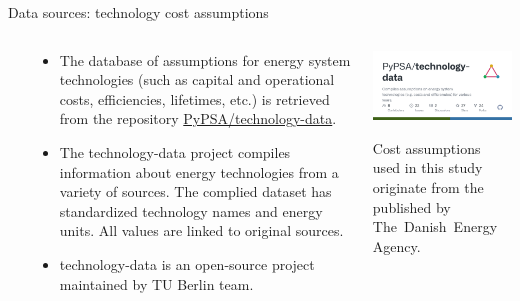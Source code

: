 \begin{frame}{Data sources: technology cost assumptions}
 
  \begin{columns}[T]\

  \begin{column}{8cm}
    {\footnotesize 
    \begin{itemize}
      \item The database of assumptions for energy system technologies (such as capital and operational costs, efficiencies, lifetimes, etc.) is retrieved from the repository \alert{\href{https://github.com/pypsa/technology-data}{PyPSA/technology-data}}. 
      
      \item The technology-data project compiles information about energy technologies from a variety of sources. The complied dataset has standardized technology names and energy units. All values are linked to original sources.

      \item  technology-data is an open-source project maintained by TU Berlin team. \\
      \faGithub~ \\
      \faBook~

    \end{itemize}}  
  \end{column}

  \begin{column}{7cm}
  \centering
  \includegraphics[width=7.2cm]{images/technology-data.png}
  \vspace{0.5cm}
  {\footnotesize
  \begin{flushright}
    Cost assumptions used in this study originate from the  published by The~Danish~Energy~Agency.
  \end{flushright}
  }
  \end{column}
  \end{columns}

\end{frame}



